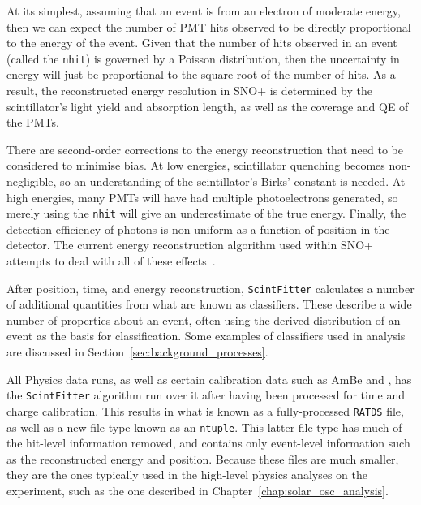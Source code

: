 At its simplest, assuming that an event is from an electron of moderate energy, then we can expect the number of PMT hits observed to be directly proportional to the energy of the event. Given that the number of hits observed in an event (called the \texttt{nhit}) is governed by a Poisson distribution, then the uncertainty in energy will just be proportional to the square root of the number of hits. As a result, the reconstructed energy resolution in SNO+ is determined by the scintillator's light yield and absorption length, as well as the coverage and QE of the PMTs.

There are second-order corrections to the energy reconstruction that need to be considered to minimise bias. At low energies, scintillator quenching becomes non-negligible, so an understanding of the scintillator's Birks' constant is needed. At high energies, many PMTs will have had multiple photoelectrons generated, so merely using the \texttt{nhit} will give an underestimate of the true energy. Finally, the detection efficiency of photons is non-uniform as a function of position in the detector. The current energy reconstruction algorithm used within SNO+ attempts to deal with all of these effects~\cite{mottramUpdatedFinctionalForm2015,kroupovaImprovingSensitivityNeutrinoless2020}. %

After position, time, and energy reconstruction, \texttt{ScintFitter} calculates a number of additional quantities from what are known as classifiers. These describe a wide number of properties about an event, often using the derived \tres{} distribution of an event as the basis for classification. Some examples of classifiers used in analysis are discussed in Section~\ref{sec:background_processes}.

All Physics data runs, as well as certain calibration data such as AmBe and , has the \texttt{ScintFitter} algorithm run over it after having been processed for time and charge calibration. This results in what is known as a fully-processed \texttt{RATDS} file, as well as a new file type known as an \texttt{ntuple}. This latter file type has much of the hit-level information removed, and contains only event-level information such as the reconstructed energy and position. Because these files are much smaller, they are the ones typically used in the high-level physics analyses on the experiment, such as the one described in Chapter~\ref{chap:solar_osc_analysis}.


